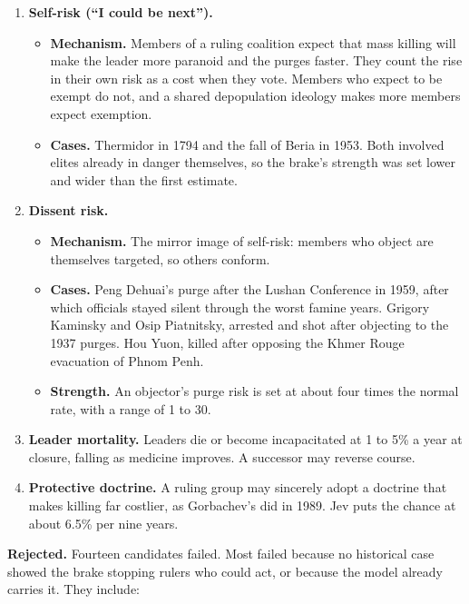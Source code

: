 \documentclass[
  10pt,
]{article}
\providecommand{\tightlist}{%
  \setlength{\itemsep}{0pt}\setlength{\parskip}{0pt}}
\begin{document}
\begin{enumerate}
\def\labelenumi{\arabic{enumi}.}
\tightlist
\item
  \textbf{Self-risk (``I could be next'').}

  \begin{itemize}
  \tightlist
  \item
    \textbf{Mechanism.} Members of a ruling coalition expect that mass killing will make the leader
    more paranoid and the purges faster. They count the rise in their own risk as a cost when they
    vote. Members who expect to be exempt do not, and a shared depopulation ideology makes more
    members expect exemption.
  \item
    \textbf{Cases.} Thermidor in 1794 and the fall of Beria in 1953. Both involved elites already in
    danger themselves, so the brake's strength was set lower and wider than the first estimate.
  \end{itemize}
\item
  \textbf{Dissent risk.}

  \begin{itemize}
  \tightlist
  \item
    \textbf{Mechanism.} The mirror image of self-risk: members who object are themselves targeted,
    so others conform.
  \item
    \textbf{Cases.} Peng Dehuai's purge after the Lushan Conference in 1959, after which officials
    stayed silent through the worst famine years. Grigory Kaminsky and Osip Piatnitsky, arrested and
    shot after objecting to the 1937 purges. Hou Yuon, killed after opposing the Khmer Rouge
    evacuation of Phnom Penh.
  \item
    \textbf{Strength.} An objector's purge risk is set at about four times the normal rate, with a
    range of 1 to 30.
  \end{itemize}
\item
  \textbf{Leader mortality.} Leaders die or become incapacitated at 1 to 5\% a year at closure,
  falling as medicine improves. A successor may reverse course.
\item
  \textbf{Protective doctrine.} A ruling group may sincerely adopt a doctrine that makes killing far
  costlier, as Gorbachev's did in 1989. Jev puts the chance at about 6.5\% per nine years.
\end{enumerate}

\textbf{Rejected.} Fourteen candidates failed. Most failed because no historical case showed the
brake stopping rulers who could act, or because the model already carries it. They include:
\end{document}
